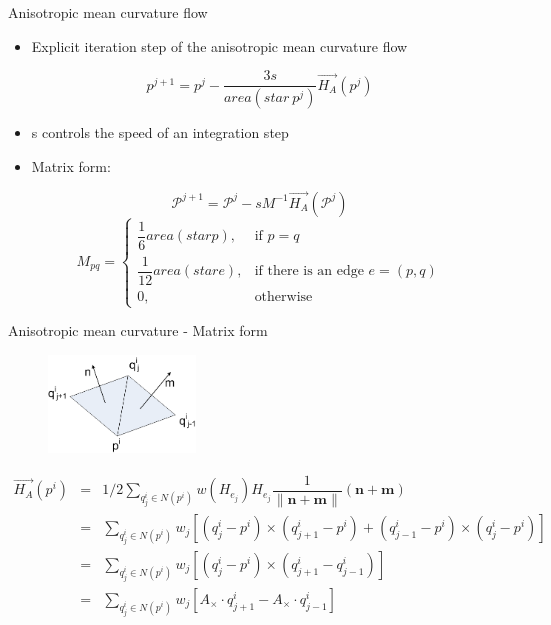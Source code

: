 \documentclass{beamer}
\begin{document}
\begin{frame}{Anisotropic mean curvature flow}
\begin{itemize}
\item Explicit iteration step of the anisotropic mean curvature flow
\end{itemize}
\begin{equation*}
p^{j+1} = p^{j} - \dfrac{3s}{area(star\ p^j)}\vec{H_A}(p^j)
\end{equation*}
\begin{itemize}
\item s controls the speed of an integration step
\item Matrix form:
\end{itemize}
\begin{equation*}
\mathcal{P}^{j+1} = \mathcal{P}^j -sM^{-1}\vec{H_A}(\mathcal{P}^j)
\end{equation*}
\begin{equation*}
M_{pq} = 
\begin{cases} \dfrac{1}{6}area(star p), & \mbox{if } p=q \\ 
\dfrac{1}{12}area(star e), & \mbox{if there is an edge } e=(p, q) \\
0, & \mbox{otherwise} \end{cases}
\end{equation*}
\end{frame}

\begin{frame}{Anisotropic mean curvature - Matrix form}
\begin{figure}[htb]
\centering
\includegraphics[width=0.35\textwidth]{edge_normal.png}
\label{fig:normal}
\end{figure}
{\small
\begin{equation*}
\begin{array} {lcl} 
\vec{H_A}(p^i) & = & 1/2\sum\limits_{q_j^i \in N(p^i)}{w(H_{e_j})H_{e_j}\dfrac{1}{\|\mathbf{n}+\mathbf{m}\|}}(\mathbf{n}+\mathbf{m}) \\ 
			   & = & \sum\limits_{q_j^i \in N(p^i)}{w_j\left[ (q_j^i-p^i)\times (q^i_{j+1} - p^i) + (q^i_{j-1}-p^i) \times (q^i_j-p^i) \right] } \\
			   & = & \sum\limits_{q_j^i \in N(p^i)}{w_j\left[ (q_j^i-p^i)\times (q^i_{j+1} - q^i_{j-1}) \right] } \\
			   & = & \sum\limits_{q_j^i \in N(p^i)}{w_j\left[ A_{\times} \cdot q^i_{j+1} - A_{\times} \cdot q^i_{j-1} \right] } \\
\end{array}
\end{equation*}
}
\end{frame}
\end{document}

